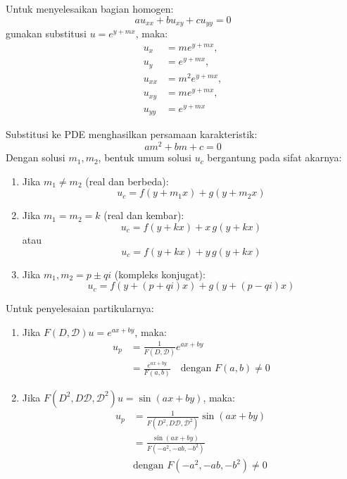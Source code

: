 \documentclass[a4paper,extrafontsizes, 9pt]{memoir}
\begin{document}
\begin{multicols}{3}
Untuk menyelesaikan bagian homogen:
\[
a u_{xx} + b u_{xy} + c u_{yy} = 0
\]
gunakan substitusi \( u = e^{y + mx} \), maka:
\begin{align*}
    u_x &= m e^{y + mx}, \\
    u_y &= e^{y + mx}, \\
    u_{xx} &= m^2 e^{y + mx}, \\
    u_{xy} &= m e^{y + mx}, \\
    u_{yy} &= e^{y + mx}
\end{align*}

Substitusi ke PDE menghasilkan persamaan karakteristik:
\[
a m^2 + b m + c = 0
\]
Dengan solusi \( m_1, m_2 \), bentuk umum solusi \( u_c \) bergantung pada sifat akarnya:

\begin{enumerate}
    \item Jika \( m_1 \ne m_2 \) (real dan berbeda):
    \[
    u_c = f(y + m_1 x) + g(y + m_2 x)
    \]
    
    \item Jika \( m_1 = m_2 = k \) (real dan kembar):
    \[
    u_c = f(y + kx) + x\,g(y + kx)
    \]
    atau
    \[
    u_c = f(y + kx) + y\,g(y + kx)
    \]
    
    \item Jika \( m_1, m_2 = p \pm qi \) (kompleks konjugat):
    \[
    u_c = f(y + (p + qi)x) + g(y + (p - qi)x)
    \]
\end{enumerate}

Untuk penyelesaian partikularnya:
\begin{enumerate}
    \item Jika \( F(D, \mathcal{D})u = e^{ax + by} \), maka:
    \begin{align*}
        u_p &= \frac{1}{F(D, \mathcal{D})} e^{ax + by} \\
            &= \frac{e^{ax + by}}{F(a,b)} \quad \text{dengan } F(a,b) \ne 0
    \end{align*}
    
    \item Jika \( F(D^2, D\mathcal{D}, \mathcal{D}^2) u = \sin(ax + by) \), maka:
    \begin{align*}
        u_p &= \frac{1}{F(D^2, D\mathcal{D}, \mathcal{D}^2)} \sin(ax + by) \\
            &= \frac{\sin(ax + by)}{F(-a^2, -ab, -b^2)}  \\
            & \text{dengan } F(-a^2, -ab, -b^2) \ne 0
    \end{align*}
    

\end{enumerate}
\end{multicols}
\end{document}
